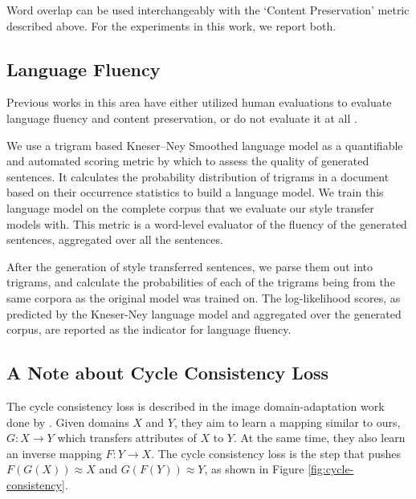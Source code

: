 Word overlap can be used interchangeably with the `Content Preservation' metric described above. For the experiments in this work, we report both.


\subsection{Language Fluency}

Previous works in this area have either utilized human evaluations \citep{shen2017style,fu2017style} to evaluate language fluency and content preservation, or do not evaluate it at all \citep{hu2017toward}.

We use a trigram based Kneser–Ney Smoothed language model \citep{kneser1995improved} as a quantifiable and automated scoring metric by which to assess the quality of generated sentences. It calculates the probability distribution of trigrams in a document based on their occurrence statistics to build a language model. We train this language model on the complete corpus that we evaluate our style transfer models with. This metric is a word-level evaluator of the fluency of the generated sentences, aggregated over all the sentences.

After the generation of style transferred sentences, we parse them out into trigrams, and calculate the probabilities of each of the trigrams being from the same corpora as the original model was trained on. The log-likelihood scores, as predicted by the Kneser-Ney language model and aggregated over the generated corpus, are reported as the indicator for language fluency.


\subsection{A Note about Cycle Consistency Loss}

The cycle consistency loss is described in the image domain-adaptation work done by \cite{zhu2017unpaired}. Given domains $X$ and $Y$, they aim to learn a mapping similar to ours, $G: X \rightarrow Y$ which transfers attributes of $X$ to $Y$. At the same time, they also learn an inverse mapping $F: Y \rightarrow X$. The cycle consistency loss is the step that pushes $F(G(X)) \approx X$ and $G(F(Y)) \approx Y$, as shown in Figure \ref{fig:cycle-consistency}.

